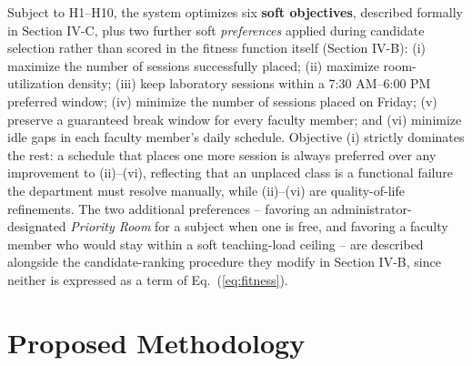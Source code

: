 \documentclass[conference]{IEEEtran}
\begin{document}
Subject to H1--H10, the system optimizes six \textbf{soft objectives}, described formally in Section IV-C, plus two further soft \emph{preferences} applied during candidate selection rather than scored in the fitness function itself (Section IV-B): (i) maximize the number of sessions successfully placed; (ii) maximize room-utilization density; (iii) keep laboratory sessions within a 7:30 AM--6:00 PM preferred window; (iv) minimize the number of sessions placed on Friday; (v) preserve a guaranteed break window for every faculty member; and (vi) minimize idle gaps in each faculty member's daily schedule. Objective (i) strictly dominates the rest: a schedule that places one more session is always preferred over any improvement to (ii)--(vi), reflecting that an unplaced class is a functional failure the department must resolve manually, while (ii)--(vi) are quality-of-life refinements. The two additional preferences -- favoring an administrator-designated \emph{Priority Room} for a subject when one is free, and favoring a faculty member who would stay within a soft teaching-load ceiling -- are described alongside the candidate-ranking procedure they modify in Section IV-B, since neither is expressed as a term of Eq.~(\ref{eq:fitness}).

\section{Proposed Methodology}
\end{document}
